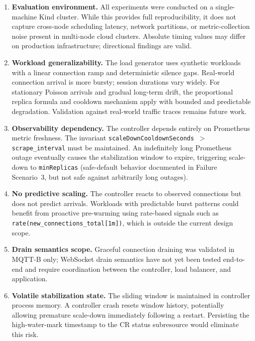 \documentclass[twocolumn]{svjour3}
\begin{document}
\begin{enumerate}[leftmargin=*]

\item \textbf{Evaluation environment.} All experiments were conducted on a single-machine
Kind cluster. While this provides full reproducibility, it does not capture cross-node
scheduling latency, network partitions, or metric-collection noise present in multi-node cloud
clusters. Absolute timing values may differ on production infrastructure; directional findings
are valid.

\item \textbf{Workload generalizability.} The load generator uses synthetic workloads with
a linear connection ramp and deterministic silence gaps. Real-world connection arrival is more
bursty; session durations vary widely. For stationary Poisson arrivals and gradual long-term
drift, the proportional replica formula and cooldown mechanism apply with bounded and
predictable degradation. Validation against real-world traffic traces remains future work.

\item \textbf{Observability dependency.} The controller depends entirely on Prometheus
metric freshness. The invariant \texttt{scaleDownCooldownSeconds $>$ scrape\_interval} must
be maintained. An indefinitely long Prometheus outage eventually causes the stabilization
window to expire, triggering scale-down to \texttt{minReplicas} (safe-default behavior
documented in Failure Scenario~3, but not safe against arbitrarily long outages).

\item \textbf{No predictive scaling.} The controller reacts to observed connections but does
not predict arrivals. Workloads with predictable burst patterns could benefit from proactive
pre-warming using rate-based signals such as \texttt{rate(new\_connections\_total[1m])},
which is outside the current design scope.

\item \textbf{Drain semantics scope.} Graceful connection draining was validated in MQTT-B
only; WebSocket drain semantics have not yet been tested end-to-end and require
coordination between the controller, load balancer, and application.

\item \textbf{Volatile stabilization state.} The sliding window is maintained in controller
process memory. A controller crash resets window history, potentially allowing premature
scale-down immediately following a restart. Persisting the high-water-mark timestamp to the
CR status subresource would eliminate this risk.


\end{enumerate}
\end{document}
